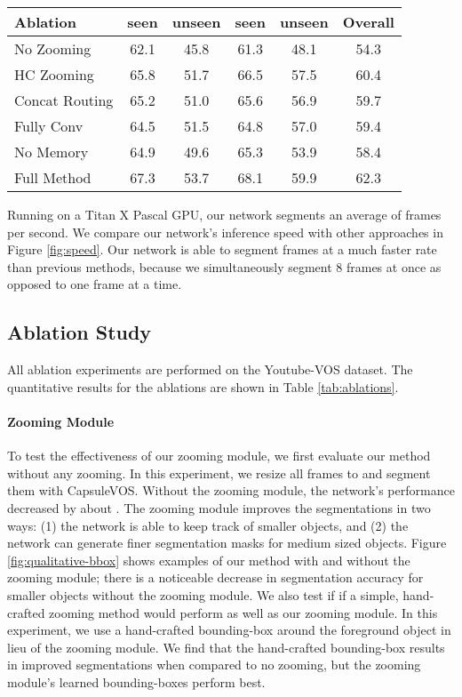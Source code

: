 \documentclass[10pt,twocolumn,letterpaper]{article}
\begin{document}
\begin{table*}[ht!]
    \centering
    \begin{tabular}{l|c|c|c|c|c}
        Ablation &  seen &  unseen &  seen &  unseen & Overall \\
        \hline
        No Zooming & 62.1 & 45.8 & 61.3 & 48.1 & 54.3 \\
        HC Zooming  & 65.8 & 51.7 & 66.5 & 57.5 & 60.4 \\
        \hline
        Concat Routing & 65.2 & 51.0 & 65.6 & 56.9 & 59.7 \\
        Fully Conv & 64.5 & 51.5 & 64.8 & 57.0 & 59.4 \\
        \hline
        No Memory & 64.9 & 49.6 & 65.3 & 53.9 & 58.4 \\
        \hline
        Full Method &  67.3 & 53.7 &  68.1 & 59.9 & 62.3 \\ 
    \end{tabular}
    \caption{Our ablation experiment results on the Youtube-VOS validation set. Each row corresponds to a different ablation. The final row contains the results of our method without any changes.}
    \label{tab:ablations}
\end{table*}

Running on a Titan X Pascal GPU, our network segments an average of  frames per second. We compare our network's inference speed with other approaches in Figure \ref{fig:speed}. Our network is able to segment frames at a much faster rate than previous methods, because we simultaneously segment 8 frames at once as opposed to one frame at a time.

\subsection{Ablation Study}
All ablation experiments are performed on the Youtube-VOS dataset. The quantitative results for the ablations are shown in Table \ref{tab:ablations}.


\paragraph{Zooming Module} To test the effectiveness of our zooming module, we first evaluate our method without any zooming. In this experiment, we resize all frames to  and segment them with CapsuleVOS. Without the zooming module, the network's performance decreased by about . The zooming module improves the segmentations in two ways: (1) the network is able to keep track of smaller objects, and (2) the network can generate finer segmentation masks for medium sized objects. Figure \ref{fig:qualitative-bbox} shows examples of our method with and without the zooming module; there is a noticeable decrease in segmentation accuracy for smaller objects without the zooming module. We also test if if a simple, hand-crafted zooming method would perform as well as our zooming module. In this experiment, we use a hand-crafted bounding-box around the foreground object in lieu of the zooming module. We find that the hand-crafted bounding-box results in improved segmentations when compared to no zooming, but the zooming module's learned bounding-boxes perform best.
\end{document}

